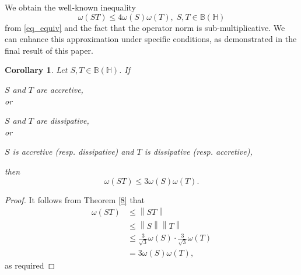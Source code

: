 \documentclass[12pt,twoside,reqno]{amsart}
\newtheorem{corollary}{Corollary}[section]
\numberwithin{equation}{section}
\begin{document}
We obtain the well-known inequality 
\[\omega \left( ST \right)\le 4\omega \left( S \right)\omega \left( T \right),\; S,T\in \mathbb B\left( \mathbb H \right)\]
 from \eqref{eq_equiv} and the fact that the operator norm is sub-multiplicative.
We can enhance this approximation under specific conditions, as demonstrated in the final result of this paper.
\begin{corollary}
Let $S,T\in \mathbb B\left( \mathbb H \right)$. If 

\item[(i)] $S$ and $T$ are accretive,\\
or
\item[(ii)] $S$ and $T$ are dissipative, \\
or
\item[(iii)] $S$ is accretive (resp. dissipative) and $T$ is dissipative (resp. accretive),

then
\[\omega \left( ST \right)\le 3\omega \left( S \right)\omega \left( T \right).\]
\end{corollary}
\begin{proof}
It follows from Theorem \ref{8} that
\[\begin{aligned}
   \omega \left( ST \right)&\le \left\| ST \right\| \\ 
 & \le \left\| S \right\|\left\| T \right\| \\ 
 & \le \frac{3}{\sqrt{3}}\omega \left( S \right)\cdot\frac{3}{\sqrt{3}}\omega \left( T \right) \\ 
 & =3\omega \left( S \right)\omega \left( T \right),  
\end{aligned}\]
as required
\end{proof}
\end{document}

